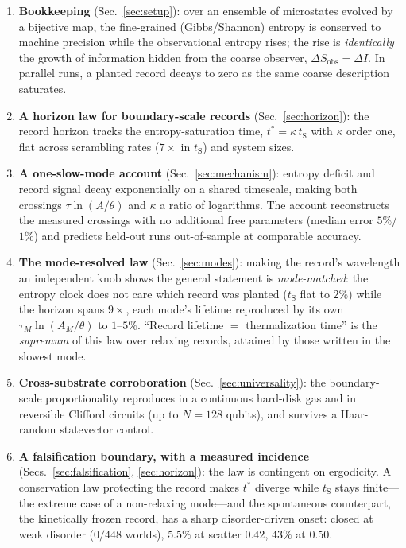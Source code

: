 \documentclass[aps,pre,twocolumn,superscriptaddress,nofootinbib,longbibliography]{revtex4-2}
\newcommand{\tS}{t_{\mathrm{S}}}
\newcommand{\tstar}{t^{*}}
\newcommand{\kap}{\kappa}
\begin{document}
\begin{enumerate}
\item \textbf{Bookkeeping} (Sec.~\ref{sec:setup}): over an ensemble of microstates evolved
by a bijective map, the fine-grained (Gibbs/Shannon) entropy is conserved to machine
precision while the observational entropy rises; the rise is \emph{identically} the growth
of information hidden from the coarse observer, $\Delta S_{\mathrm{obs}}=\Delta I$. In
parallel runs, a planted record decays to zero as the same coarse description saturates.
\item \textbf{A horizon law for boundary-scale records} (Sec.~\ref{sec:horizon}): the
record horizon tracks the entropy-saturation time, $\tstar=\kap\,\tS$ with $\kap$ order
one, flat across scrambling rates ($7\times$ in $\tS$) and system sizes.
\item \textbf{A one-slow-mode account} (Sec.~\ref{sec:mechanism}): entropy deficit and
record signal decay exponentially on a shared timescale, making both crossings
$\tau\ln(A/\theta)$ and $\kap$ a ratio of logarithms. The account reconstructs the measured
crossings with no additional free parameters (median error $5\%$/$1\%$) and predicts
held-out runs out-of-sample at comparable accuracy.
\item \textbf{The mode-resolved law} (Sec.~\ref{sec:modes}): making the record's wavelength
an independent knob shows the general statement is \emph{mode-matched}: the entropy clock
does not care which record was planted ($\tS$ flat to $2\%$) while the horizon spans
$9\times$, each mode's lifetime reproduced by its own $\tau_M\ln(A_M/\theta)$ to
$1$--$5\%$. ``Record lifetime $=$ thermalization time'' is the \emph{supremum} of this
law over relaxing records, attained by those written in the slowest mode.
\item \textbf{Cross-substrate corroboration} (Sec.~\ref{sec:universality}): the
boundary-scale proportionality reproduces in a continuous hard-disk gas and in reversible
Clifford circuits (up to $N=128$ qubits), and survives a Haar-random statevector control.
\item \textbf{A falsification boundary, with a measured incidence}
(Secs.~\ref{sec:falsification}, \ref{sec:horizon}): the law is contingent on ergodicity.
A conservation law protecting the record makes $\tstar$ diverge while $\tS$ stays
finite---the extreme case of a non-relaxing mode---and the spontaneous counterpart, the
kinetically frozen record, has a sharp disorder-driven onset: closed at weak disorder
($0/448$ worlds), $5.5\%$ at scatter $0.42$, $43\%$ at $0.50$.

\end{enumerate}
\end{document}

